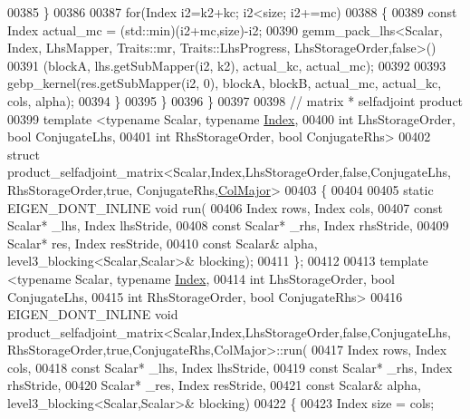 \begin{DoxyCode}
00385       \}
00386 
00387       \textcolor{keywordflow}{for}(Index i2=k2+kc; i2<size; i2+=mc)
00388       \{
00389         \textcolor{keyword}{const} Index actual\_mc = (std::min)(i2+mc,size)-i2;
00390         gemm\_pack\_lhs<Scalar, Index, LhsMapper, Traits::mr, Traits::LhsProgress, LhsStorageOrder,false>()
00391           (blockA, lhs.getSubMapper(i2, k2), actual\_kc, actual\_mc);
00392 
00393         gebp\_kernel(res.getSubMapper(i2, 0), blockA, blockB, actual\_mc, actual\_kc, cols, alpha);
00394       \}
00395     \}
00396   \}
00397 
00398 \textcolor{comment}{// matrix * selfadjoint product}
00399 \textcolor{keyword}{template} <\textcolor{keyword}{typename} Scalar, \textcolor{keyword}{typename} \hyperlink{namespace_eigen_a62e77e0933482dafde8fe197d9a2cfde}{Index},
00400           \textcolor{keywordtype}{int} LhsStorageOrder, \textcolor{keywordtype}{bool} ConjugateLhs,
00401           \textcolor{keywordtype}{int} RhsStorageOrder, \textcolor{keywordtype}{bool} ConjugateRhs>
00402 \textcolor{keyword}{struct }product\_selfadjoint\_matrix<Scalar,Index,LhsStorageOrder,false,ConjugateLhs, RhsStorageOrder,true,
      ConjugateRhs,\hyperlink{group__enums_ggaacded1a18ae58b0f554751f6cdf9eb13a0cbd4bdd0abcfc0224c5fcb5e4f6669a}{ColMajor}>
00403 \{
00404 
00405   \textcolor{keyword}{static} EIGEN\_DONT\_INLINE \textcolor{keywordtype}{void} run(
00406     Index rows, Index cols,
00407     \textcolor{keyword}{const} Scalar* \_lhs, Index lhsStride,
00408     \textcolor{keyword}{const} Scalar* \_rhs, Index rhsStride,
00409     Scalar* res,        Index resStride,
00410     \textcolor{keyword}{const} Scalar& alpha, level3\_blocking<Scalar,Scalar>& blocking);
00411 \};
00412 
00413 \textcolor{keyword}{template} <\textcolor{keyword}{typename} Scalar, \textcolor{keyword}{typename} \hyperlink{namespace_eigen_a62e77e0933482dafde8fe197d9a2cfde}{Index},
00414           \textcolor{keywordtype}{int} LhsStorageOrder, \textcolor{keywordtype}{bool} ConjugateLhs,
00415           \textcolor{keywordtype}{int} RhsStorageOrder, \textcolor{keywordtype}{bool} ConjugateRhs>
00416 EIGEN\_DONT\_INLINE \textcolor{keywordtype}{void} product\_selfadjoint\_matrix<Scalar,Index,LhsStorageOrder,false,ConjugateLhs,
       RhsStorageOrder,true,ConjugateRhs,ColMajor>::run(
00417     Index rows, Index cols,
00418     \textcolor{keyword}{const} Scalar* \_lhs, Index lhsStride,
00419     \textcolor{keyword}{const} Scalar* \_rhs, Index rhsStride,
00420     Scalar* \_res,        Index resStride,
00421     \textcolor{keyword}{const} Scalar& alpha, level3\_blocking<Scalar,Scalar>& blocking)
00422   \{
00423     Index size = cols;

\end{DoxyCode}
